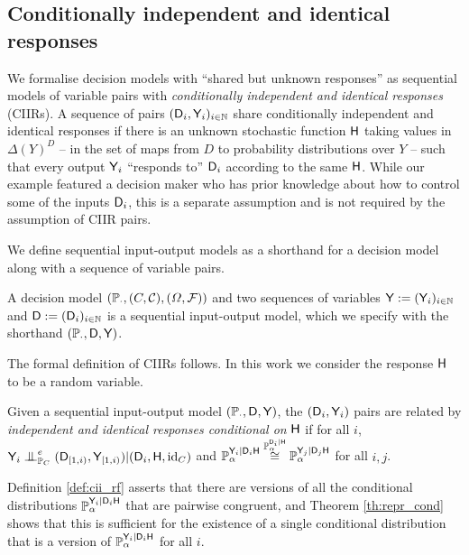 \subsection[Response functions]{Conditionally independent and identical responses}\label{sec:response_functions}

We formalise decision models with ``shared but unknown responses'' as sequential models of variable pairs with \emph{conditionally independent and identical responses} (CIIRs). A sequence of pairs $(\mathsf{D}_i,\mathsf{Y}_i)_{i\in \mathbb{N}}$ share conditionally independent and identical responses if there is an unknown stochastic function $\mathsf{H}$ taking values in $\Delta(Y)^D$ -- in the set of maps from $D$ to probability distributions over $Y$ -- such that every output $\mathsf{Y}_i$ ``responds to'' $\mathsf{D}_i$ according to the same $\mathsf{H}$. While our example featured a decision maker who has prior knowledge about how to control some of the inputs $\mathsf{D}_i$, this is a separate assumption and is not required by the assumption of CIIR pairs.

We define sequential input-output models as a shorthand for a decision model along with a sequence of variable pairs.

\begin{definition}\label{def:seq_io}
A decision model $(\mathbb{P}_{\cdot}, (C,\mathcal{C}), (\Omega,\mathcal{F}))$ and two sequences of variables $\mathsf{Y}:=(\mathsf{Y}_i)_{i\in \mathbb{N}}$ and $\mathsf{D}:=(\mathsf{D}_i)_{i\in\mathbb{N}}$ is a sequential input-output model, which we specify with the shorthand $(\mathbb{P}_\cdot,\mathsf{D},\mathsf{Y})$.
\end{definition}

The formal definition of CIIRs follows. In this work we consider the response $\mathsf{H}$ to be a random variable.

\begin{definition}\label{def:cii_rf}
Given a sequential input-output model $(\mathbb{P}_\cdot,\mathsf{D},\mathsf{Y})$, the $(\mathsf{D}_i,\mathsf{Y}_i)$ pairs are related by \emph{independent and identical responses conditional on} $\mathsf{H}$ if for all $i$, $\RV{Y}_i\CI^e_{\prob{P}_C} (\RV{D}_{[1,i)},\RV{Y}_{[1,i)})|(\RV{D}_i,\RV{H},\text{id}_C)$ and $\mathbb{P}_\alpha^{\mathsf{Y}_i|\mathsf{D}_i\mathsf{H}}\overset{\mathbb{P}_\alpha^{\mathsf{D}_i|\mathsf{H}}}{\cong}\mathbb{P}_\alpha^{\mathsf{Y}_j|\mathsf{D}_j\mathsf{H}}$ for all $i,j$.
\end{definition}

Definition \ref{def:cii_rf} asserts that there are versions of all the conditional distributions $\mathbb{P}_\alpha^{\mathsf{Y}_i|\mathsf{D}_i\mathsf{H}}$ that are pairwise congruent, and Theorem \ref{th:repr_cond} shows that this is sufficient for the existence of a single conditional distribution that is a version of $\mathbb{P}_\alpha^{\mathsf{Y}_i|\mathsf{D}_i\mathsf{H}}$ for all $i$.

